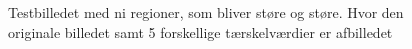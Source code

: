 \begin{figure}[!h]
{       \label{0,0015}}
    \caption{Testbilledet med ni regioner, som bliver støre og støre. Hvor den originale billedet samt 5 forskellige tærskelværdier er afbilledet}
    \label{stoerelse_sammenlining}
\end{figure}
